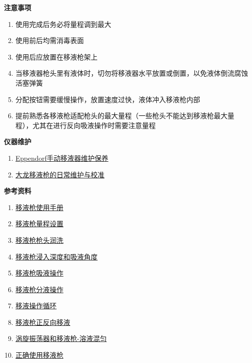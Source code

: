 \documentclass[
]{book}
\providecommand{\tightlist}{%
  \setlength{\itemsep}{0pt}\setlength{\parskip}{0pt}}
\begin{document}
\textbf{注意事项}

\begin{enumerate}
\def\labelenumi{\arabic{enumi}.}
\tightlist
\item
  使用完成后务必将量程调到最大
\item
  使用前后均需消毒表面
\item
  使用后应放置在移液枪架上
\item
  当移液器枪头里有液体时，切勿将移液器水平放置或倒置，以免液体倒流腐蚀活塞弹簧
\item
  分配按钮需要缓慢操作，放置速度过快，液体冲入移液枪内部
\item
  提前熟悉各移液枪适配枪头的最大量程（一些枪头不能达到移液枪最大量程），尤其在进行反向吸液操作时需要注意量程
\end{enumerate}

\textbf{仪器维护}

\begin{enumerate}
\def\labelenumi{\arabic{enumi}.}
\tightlist
\item
  \href{https://www.bilibili.com/video/BV1FT4y1o7iy}{Eppendorf手动移液器维护保养}
\item
  \href{https://www.bilibili.com/video/BV1UZ4y1z7oZ}{大龙移液枪的日常维护与校准}
\end{enumerate}

\textbf{参考资料}

\begin{enumerate}
\def\labelenumi{\arabic{enumi}.}
\tightlist
\item
  \href{https://www.eppendorf.com/fileadmin/knowledgebase/asset/CN-zh/186591.pdf}{移液枪使用手册}
\item
  \href{https://www.bilibili.com/video/BV17b4y1J7mN}{移液枪量程设置}
\item
  \href{https://www.bilibili.com/video/BV1iZ4y1f7sq}{移液枪枪头润洗}
\item
  \href{https://www.bilibili.com/video/BV1XS4y1j7Uk}{移液枪浸入深度和吸液角度}
\item
  \href{https://www.bilibili.com/video/BV1eY411h7V5}{移液枪吸液操作}
\item
  \href{https://www.bilibili.com/video/BV1ES4y1f7uA}{移液枪分液操作}
\item
  \href{https://www.bilibili.com/video/BV15b4y1J7RF}{移液操作循环}
\item
  \href{https://www.bilibili.com/video/BV17e4y1d7ex}{移液枪正反向移液}
\item
  \href{https://www.bilibili.com/video/BV1g3411g7ZY}{涡旋振荡器和移液枪-溶液混匀}
\item
  \href{https://www.bilibili.com/video/BV1Av4y1G7r4}{正确使用移液枪}
\end{enumerate}
\end{document}
